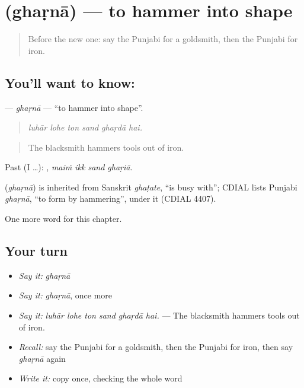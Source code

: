 \section[\texorpdfstring{\pa{ਘੜਨਾ} (ghaṛnā)}{ਘੜਨਾ (ghaṛnā)}]{ (ghaṛnā) — to hammer into shape}

\label{lesson:PA-C335-gharna}



\begin{quote}
Before the new one: say the Punjabi for a goldsmith, then the Punjabi for iron.
\end{quote}

\subsection*{You'll want to know: }
\textbf{} — \emph{ghaṛnā} — \textquotedblleft{}to hammer into shape\textquotedblright{}.

\begin{quote}
     
\end{quote}

\begin{quote}
\emph{luhār lohe ton sand ghaṛdā hai.}
\end{quote}

\begin{quote}
The blacksmith hammers tools out of iron.
\end{quote}

Past (I …):    , \emph{maiṁ ikk sand ghaṛiā}.

\begin{cousinweb}
\textbf{} (\emph{ghaṛnā}) is inherited from Sanskrit \emph{ghaṭate}, \textquotedblleft{}is busy with\textquotedblright{}; CDIAL lists Punjabi \emph{ghaṛnā}, \textquotedblleft{}to form by hammering\textquotedblright{}, under it (CDIAL 4407).
\end{cousinweb}

\begin{grammarlens}[title={What you've built}]
One more word for this chapter.
\end{grammarlens}

\subsection*{Your turn}
\begin{itemize}
\raggedright
  \item \emph{Say it:} \emph{ghaṛnā}
  \item \emph{Say it:} \emph{ghaṛnā}, once more
  \item \emph{Say it:} \emph{luhār lohe ton sand ghaṛdā hai.} — The blacksmith hammers tools out of iron.
  \item \emph{Recall:} say the Punjabi for a goldsmith, then the Punjabi for iron, then say \emph{ghaṛnā} again
  \item \emph{Write it:} copy \textbf{} once, checking the whole word
\end{itemize}

